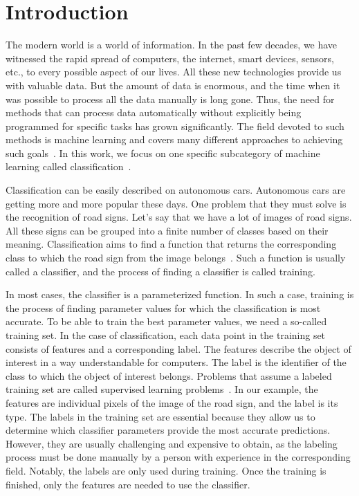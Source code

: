 \chapter*{Introduction}

The modern world is a world of information. In the past few decades, we have witnessed the rapid spread of computers, the internet, smart devices, sensors, etc., to every possible aspect of our lives. All these new technologies provide us with valuable data. But the amount of data is enormous, and the time when it was possible to process all the data manually is long gone. Thus, the need for methods that can process data automatically without explicitly being programmed for specific tasks has grown significantly. The field devoted to such methods is machine learning and covers many different approaches to achieving such goals~\cite{mitchell1997machine}. In this work, we focus on one specific subcategory of machine learning called classification~\cite{aggarwal2021artificial}.

Classification can be easily described on autonomous cars. Autonomous cars are getting more and more popular these days. One problem that they must solve is the recognition of road signs. Let's say that we have a lot of images of road signs. All these signs can be grouped into a finite number of classes based on their meaning. Classification aims to find a function that returns the corresponding class to which the road sign from the image belongs~\cite{swaminathan2019autonomous}. Such a function is usually called a classifier, and the process of finding a classifier is called training.

In most cases, the classifier is a parameterized function. In such a case, training is the process of finding parameter values for which the classification is most accurate. To be able to train the best parameter values, we need a so-called training set. In the case of classification, each data point in the training set consists of features and a corresponding label. The features describe the object of interest in a way understandable for computers. The label is the identifier of the class to which the object of interest belongs. Problems that assume a labeled training set are called supervised learning problems~\cite{aggarwal2021artificial}. In our example, the features are individual pixels of the image of the road sign, and the label is its type. The labels in the training set are essential because they allow us to determine which classifier parameters provide the most accurate predictions. However, they are usually challenging and expensive to obtain, as the labeling process must be done manually by a person with experience in the corresponding field. Notably, the labels are only used during training. Once the training is finished, only the features are needed to use the classifier.

